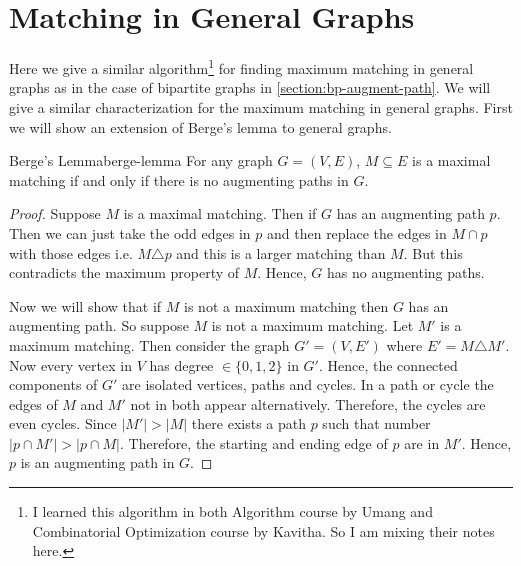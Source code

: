 \section{Matching in General Graphs}
Here we give a similar algorithm\footnote{I learned this algorithm in both Algorithm course by Umang and Combinatorial Optimization course by Kavitha. So I am mixing their notes here.} for finding maximum matching in general graphs as in the case of bipartite graphs in \autoref{section:bp-augment-path}. We will give a similar characterization for the maximum matching in general graphs. First we will show an extension of Berge's lemma to general graphs.
\begin{Theorem}{Berge's Lemma}{berge-lemma}
	For any graph $G=(V,E)$, $M\subseteq E$ is a maximal matching if and only if there is no augmenting paths in $G$.
\end{Theorem}
\begin{proof}
	Suppose $M$ is a maximal matching. Then if $G$ has an augmenting path $p$. Then we can just take the odd edges in $p$ and then replace the edges in $M\cap p$ with those edges i.e. $M\triangle p$ and this is a larger matching than $M$. But this contradicts the maximum property of $M$. Hence, $G$ has no augmenting paths.

	Now we will show that if $M$ is not a maximum matching then $G$ has an augmenting path. So suppose $M$ is not a maximum matching. Let $M'$ is a maximum matching. Then consider the graph $G'=(V,E')$ where $E'=M\triangle M'$. Now every vertex in $V$ has degree $\in \{0,1,2\}$ in $G'$. Hence, the connected components of $G'$ are isolated vertices, paths and cycles. In a path or cycle the edges of $M$ and $M'$ not in both appear alternatively. Therefore, the cycles are even cycles. Since $|M'|>|M|$ there exists a path $p$ such that number $|p\cap M'|>|p\cap M|$. Therefore, the starting and ending edge of $p$ are in $M'$. Hence, $p$ is an augmenting path in $G$.
\end{proof}
